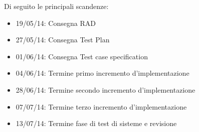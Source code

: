 Di seguito le principali scandenze:
\begin{itemize}
\item 19/05/14: Consegna RAD
\item 27/05/14: Consegna Test Plan
\item 01/06/14: Consegna Test case specification
\item 04/06/14: Termine primo incremento d'implementazione
\item 28/06/14: Termine secondo incremento d'implementazione
\item 07/07/14: Termine terzo incremento d'implementazione
\item 13/07/14: Termine fase di test di sisteme e revisione
\end{itemize}
